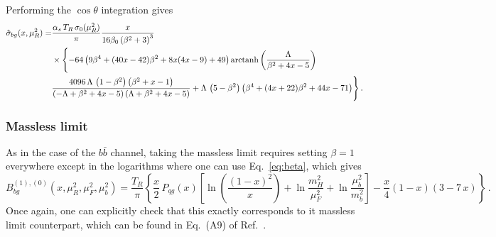 Performing the $\cos\theta$ integration gives
\begin{equation}
  \begin{split}
    \hat{\sigma}_{bg}(x,\mu_R^2) =&
    \frac{\alpha_s\,T_R\,\sigma_0(\mu_R^2)}{\pi}\frac{  x}{16 \beta_0
      \left(\beta^2+3\right)^3}\\
    &\times\Biggl\{- 64 \left(9 \beta^4+(40
     x-42) \beta^2 +8 x (4 x-9)+49\right){\rm arctanh}\left(\frac{\Lambda }{\beta^2+4
       x-5}\right)   \\
    &\frac{4096\,\Lambda\, \left(1-\beta^2 \right)
      \left(\beta^2+x-1\right)} {\left(-\Lambda +\beta^2+4 x-5\right)
      \left(\Lambda +\beta^2+4 x-5\right)} +
    \Lambda\,\left(5-\beta^2\right) \left(\beta^4+(4 x+22) \beta^2+44 x-71\right)
  \Biggr\}\,.
  \end{split}
\end{equation}

\subsubsection{Massless limit}
As in the case of the $b\bar{b}$ channel, taking the massless limit
requires setting $\beta=1$ everywhere except in the logarithms where
one can use Eq.~\eqref{eq:beta}, which gives
\begin{equation}
  \label{eq:mlimbg}
  B_{bg}^{(1),(0)}(x,\mu_R^2,\mu_F^2,\mu_b^2) =
  \frac{T_R}{\pi}\left\{  
    \frac{x}{2}\,P_{qg}(x)\left[
      \ln\left(\frac{(1-x)^2}{x}\right)+\ln\frac{m_H^2}{\mu_F^2}+
      \ln{\frac{\mu_b^2}{m_b^2}} \right]-\frac{x}{4}(1-x)(3-7\,x) \right\}\,.
\end{equation}
Once again, one can explicitly check that this exactly corresponds to
it massless limit counterpart, which can be found in Eq.~(A9) of Ref.~\cite{Harlander:2003ai}.
